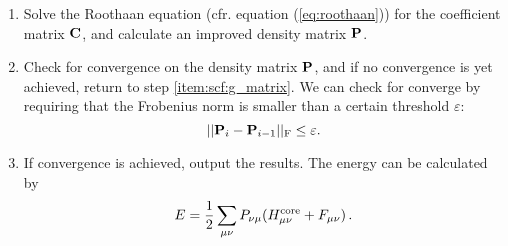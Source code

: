 \documentclass[12pt]{article}
\begin{document}
\begin{enumerate}
        \item Solve the Roothaan equation (cfr. equation (\ref{eq:roothaan})) for the coefficient matrix $\vb{C}$, and calculate an improved density matrix $\vb{P}$. 

        \item Check for convergence on the density matrix $\vb{P}$, and if no convergence is yet achieved, return to step \ref{item:scf:g_matrix}. We can check for converge by requiring that the Frobenius norm is smaller than a certain threshold $\varepsilon$:
        \begin{equation}
            ||\vb{P}_i - \vb{P}_{i-1}||_\text{F} \leq \varepsilon .
        \end{equation}

        \item If convergence is achieved, output the results. The energy can be calculated by
        \begin{equation}
            E = \frac{1}{2} \sum_{\mu \nu} P_{\nu \mu} (H^\text{core}_{\mu \nu} + F_{\mu \nu}) \thinspace .
        \end{equation}
    \end{enumerate}






\end{document}
